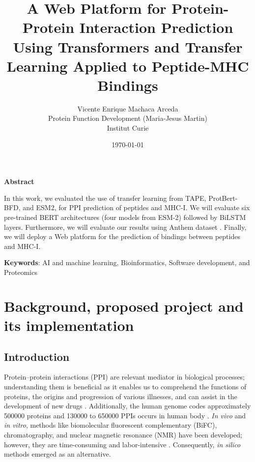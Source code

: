 \documentclass[a4paper,11pt]{article}
\title{ A Web Platform for Protein-Protein Interaction Prediction Using Transformers and Transfer Learning Applied to Peptide-MHC Bindings }
\author{Vicente Enrique Machaca Arceda \\ Protein Function Development (Maria-Jesus Martin) \\ Institut Curie}
\date{\today}
\begin{document}
	
\maketitle
	
\begin{center}
	\begin{large}
		\textbf{Abstract}
	\end{large} 

	\vspace{0.3cm}
	
	In this work, we evaluated the use of transfer learning from TAPE, ProtBert-BFD, and ESM2, for PPI prediction of peptides and MHC-I. We will evaluate six pre-trained BERT architectures (four models from ESM-2) followed by  BiLSTM layers. Furthermore, we will evaluate our results using Anthem  dataset \cite{mei2021anthem}. Finally, we will deploy a Web platform for the prediction of bindings between peptides and MHC-I.
	

\end{center}
	
\textbf{Keywords}: 	AI and machine learning, Bioinformatics, Software development, and Proteomics
	
	

\section{Background, proposed project and its implementation}

\subsection{Introduction}

Protein–protein interactions (PPI) are relevant mediator in biological processes; understanding  them is beneficial as it enables us to comprehend the functions of proteins, the origins and progression of various illnesses, and can assist in the development of new drugs  \cite{hu2022deep,jha2023prediction}. Additionally, the human genome codes approximately 500000 proteins and 130000 to 650000 PPIs occurs in human body \cite{hu2022deep}. \textit{In vivo} and \textit{in vitro}, methods like biomolecular fluorescent complementary (BiFC), chromatography, and nuclear magnetic resonance (NMR) have been developed; however, they are time-consuming and labor-intensive \cite{rao2014protein,hu2022deep}. Consequently, \textit{in silico} methods  emerged as an alternative.\\
\end{document}
